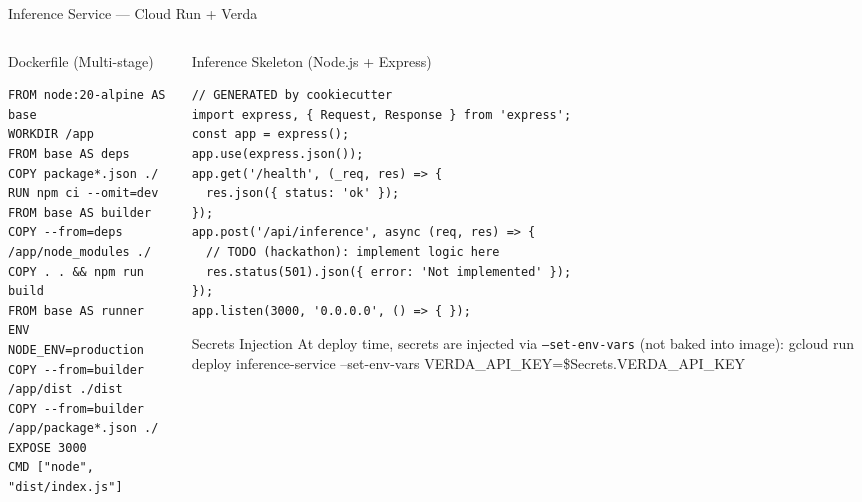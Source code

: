\documentclass[10pt,aspectratio=169,t]{beamer}
\begin{document}
\begin{frame}{Inference Service --- Cloud Run + Verda}

  \begin{columns}

    \begin{column}{0.45\paperwidth}

      \begin{block}{Dockerfile (Multi-stage)}
        \ttfamily\scriptsize
        \begin{verbatim}
FROM node:20-alpine AS base
WORKDIR /app
FROM base AS deps
COPY package*.json ./
RUN npm ci --omit=dev
FROM base AS builder
COPY --from=deps /app/node_modules ./
COPY . . && npm run build
FROM base AS runner
ENV NODE_ENV=production
COPY --from=builder /app/dist ./dist
COPY --from=builder /app/package*.json ./
EXPOSE 3000
CMD ["node", "dist/index.js"]
        \end{verbatim}
      \end{block}

    \end{column}

    \begin{column}{0.5\paperwidth}

      \begin{block}{Inference Skeleton (Node.js + Express)}
        \ttfamily\scriptsize
        \begin{verbatim}
// GENERATED by cookiecutter
import express, { Request, Response } from 'express';
const app = express();
app.use(express.json());
app.get('/health', (_req, res) => {
  res.json({ status: 'ok' });
});
app.post('/api/inference', async (req, res) => {
  // TODO (hackathon): implement logic here
  res.status(501).json({ error: 'Not implemented' });
});
app.listen(3000, '0.0.0.0', () => { });
        \end{verbatim}
      \end{block}

      \begin{alertblock}{Secrets Injection}
        At deploy time, secrets are injected via \texttt{--set-env-vars} (not baked into image):
        \ttfamily\scriptsize
        gcloud run deploy inference-service --set-env-vars VERDA\_API\_KEY=\$Secrets.VERDA\_API\_KEY
      \end{alertblock}

    \end{column}

  \end{columns}

\end{frame}
\end{document}
